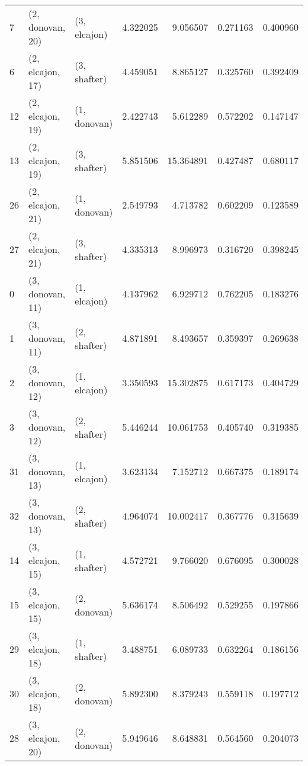 \begin{tabular}{lllrrrr}
7  &  (2, donovan, 20) &     (3, elcajon) &  4.322025 &   9.056507 &   0.271163 &  0.400960 \\
6  &  (2, elcajon, 17) &     (3, shafter) &  4.459051 &   8.865127 &   0.325760 &  0.392409 \\
12 &  (2, elcajon, 19) &     (1, donovan) &  2.422743 &   5.612289 &   0.572202 &  0.147147 \\
13 &  (2, elcajon, 19) &     (3, shafter) &  5.851506 &  15.364891 &   0.427487 &  0.680117 \\
26 &  (2, elcajon, 21) &     (1, donovan) &  2.549793 &   4.713782 &   0.602209 &  0.123589 \\
27 &  (2, elcajon, 21) &     (3, shafter) &  4.335313 &   8.996973 &   0.316720 &  0.398245 \\
0  &  (3, donovan, 11) &     (1, elcajon) &  4.137962 &   6.929712 &   0.762205 &  0.183276 \\
1  &  (3, donovan, 11) &     (2, shafter) &  4.871891 &   8.493657 &   0.359397 &  0.269638 \\
2  &  (3, donovan, 12) &     (1, elcajon) &  3.350593 &  15.302875 &   0.617173 &  0.404729 \\
3  &  (3, donovan, 12) &     (2, shafter) &  5.446244 &  10.061753 &   0.405740 &  0.319385 \\
31 &  (3, donovan, 13) &     (1, elcajon) &  3.623134 &   7.152712 &   0.667375 &  0.189174 \\
32 &  (3, donovan, 13) &     (2, shafter) &  4.964074 &  10.002417 &   0.367776 &  0.315639 \\
14 &  (3, elcajon, 15) &     (1, shafter) &  4.572721 &   9.766020 &   0.676095 &  0.300028 \\
15 &  (3, elcajon, 15) &     (2, donovan) &  5.636174 &   8.506492 &   0.529255 &  0.197866 \\
29 &  (3, elcajon, 18) &     (1, shafter) &  3.488751 &   6.089733 &   0.632264 &  0.186156 \\
30 &  (3, elcajon, 18) &     (2, donovan) &  5.892300 &   8.379243 &   0.559118 &  0.197712 \\
28 &  (3, elcajon, 20) &     (2, donovan) &  5.949646 &   8.648831 &   0.564560 &  0.204073 \\
\bottomrule
\end{tabular}
